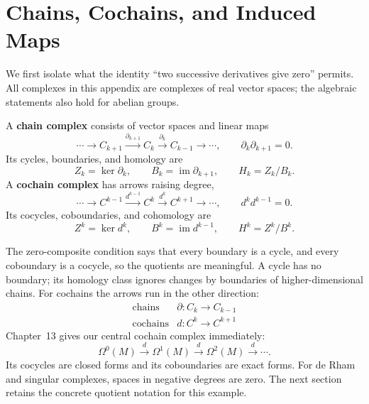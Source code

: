 \section{Chains, Cochains, and Induced Maps}
\label{sec:chain-cochain-language}
We first isolate what the identity ``two successive derivatives give
zero'' permits. All complexes in this appendix are complexes of real
vector spaces; the algebraic statements also hold for abelian groups.
\begin{definition}\label{def:chain-cochain-complex}
A \textbf{chain complex} consists of vector spaces and linear maps
\[
\cdots\longrightarrow C_{k+1}\xrightarrow{\partial_{k+1}}C_k
\xrightarrow{\partial_k}C_{k-1}\longrightarrow\cdots,
\qquad \partial_k\partial_{k+1}=0.
\]
Its cycles, boundaries, and homology are
\[
Z_k=\ker\partial_k,\qquad B_k=\operatorname{im}\partial_{k+1},
\qquad H_k=Z_k/B_k.
\]
A \textbf{cochain complex} has arrows raising degree,
\[
\cdots\longrightarrow C^{k-1}\xrightarrow{d^{k-1}}C^k
\xrightarrow{d^k}C^{k+1}\longrightarrow\cdots,
\qquad d^kd^{k-1}=0.
\]
Its cocycles, coboundaries, and cohomology are
\[
Z^k=\ker d^k,\qquad B^k=\operatorname{im}d^{k-1},
\qquad H^k=Z^k/B^k.
\]
\end{definition}
The zero-composite condition says that every boundary is a cycle, and
every coboundary is a cocycle, so the quotients are meaningful. A cycle
has no boundary; its homology class ignores changes by boundaries of
higher-dimensional chains. For cochains the arrows run in the other direction:
\[
\begin{array}{c|c}
\text{chains}&\partial:C_k\to C_{k-1}\\
\text{cochains}&d:C^k\to C^{k+1}
\end{array}
\]
Chapter~13 gives our central cochain complex immediately:
\[
\Omega^0(M)\xrightarrow d\Omega^1(M)\xrightarrow d
\Omega^2(M)\xrightarrow d\cdots.
\]
Its cocycles are closed forms and its coboundaries are exact forms.
For de Rham and singular complexes, spaces in negative degrees are zero.
The next section retains the concrete quotient notation for this example.

